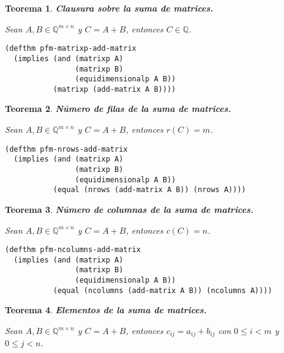 \documentclass[a4paper,10pt]{article}
\newcommand{\Q}[1]{#1 \in \mathbb{Q}}
\newcommand{\M}[3]{#1 \in \mathbb{Q}^{#2 \times #3}}
\newtheorem{teor}{{Teorema}}
\begin{document}
\begin{teor} \textbf{Clausura sobre la suma de matrices.}\vspace{8pt}\par
Sean $\M{A,B}{m}{n}$ y $C = A + B$, entonces $\Q{C}$.
\end{teor}

\begin{lstlisting}[language=clips]
(defthm pfm-matrixp-add-matrix
  (implies (and (matrixp A)
                (matrixp B)
                (equidimensionalp A B))
           (matrixp (add-matrix A B))))
\end{lstlisting}

\par \vspace{16pt}

\begin{teor} \textbf{Número de filas de la suma de matrices.}\vspace{8pt}\par
Sean $\M{A,B}{m}{n}$ y $C = A + B$, entonces $r(C) = m$.
\end{teor}

\begin{lstlisting}[language=clips]
(defthm pfm-nrows-add-matrix
  (implies (and (matrixp A)
                (matrixp B)
                (equidimensionalp A B))
           (equal (nrows (add-matrix A B)) (nrows A))))
\end{lstlisting}

\par \vspace{16pt}

\begin{teor} \textbf{Número de columnas de la suma de matrices.}\vspace{8pt}\par
Sean $\M{A,B}{m}{n}$ y $C = A + B$, entonces $c(C) = n$.
\end{teor}

\begin{lstlisting}[language=clips]
(defthm pfm-ncolumns-add-matrix
  (implies (and (matrixp A)
                (matrixp B)
                (equidimensionalp A B))
           (equal (ncolumns (add-matrix A B)) (ncolumns A))))
\end{lstlisting}

\par \vspace{16pt}

\begin{teor} \textbf{Elementos de la suma de matrices.}\vspace{8pt}\par
Sean $\M{A,B}{m}{n}$ y $C = A + B$, entonces $c_{ij} = a_{ij} + b_{ij}$ con $0 \leq i < m$ y $0 \leq j < n$.
\end{teor}
\end{document}
